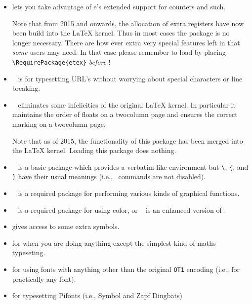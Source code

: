 \begin{itemize}
\item {} lets you take advantage of e\tx's extended support
      for counters and such.

      Note that from 2015 and onwards, the allocation of extra
      registers have now been build into the LaTeX kernel. Thus in
      most cases the  package is no longer
      necessary. There are how ever extra very special features left
      in  that \emph{some} users may need. In that case
      please remember to load  by placing
      \verb|\RequirePackage{etex}| \emph{before} ! 
\item {}~\cite{URL} is for typesetting URL's without worrying
  about special characters or line breaking.
\item {}~\cite{FIXLTX2E} eliminates some infelicities
      of the original LaTeX kernel. In particular it maintains the order
      of floats on a twocolumn page 
      and ensures the correct marking
      on a twocolumn page.

      Note that as of 2015, the functionality of this package has been
      merged into the \LaTeX{} kernel. Loading this package does nothing.

      
\item {}~\cite{ALLTT} is a basic package which provides a 
      verbatim-like environment but \verb?\?, \verb?{?, and \verb?}? have their
      usual meanings (i.e., \ltx\ commands are not disabled).
\item {}~\cite{GRAPHICX} is a required package for
      performing various kinds of graphical functions. 
\item {}~\cite{COLOR} is a required package for using color,
       or ~\cite{XCOLOR} is an enhanced version of .
\item {} gives access to some extra symbols.
\item {} for when you are doing anything except the
       simplest kind of maths typeseting.
\item {} for using fonts with anything other than the
      original \texttt{OT1} encoding (i.e., for practically any font).
\item {} for typesetting Pifonts 
       (i.e., Symbol and 
               Zapf Dingbats)
\end{itemize}

